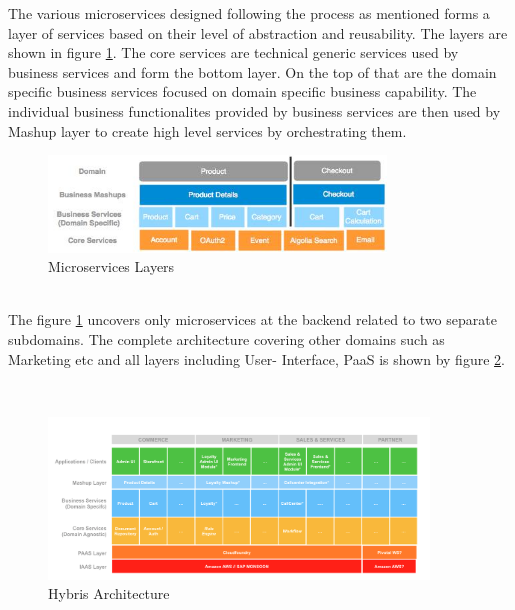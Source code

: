 The various microservices designed following the process as mentioned forms a layer of services based on their level of abstraction and reusability. The layers are shown in figure \ref{fig:hybris_architecture/interview/microservices-layers}. The core services are technical generic services used by business services and form the bottom layer. On the top of that are the domain specific business services focused on domain specific business capability. The individual business functionalites provided by business services are then used by Mashup layer to create high level services by orchestrating them.
\\
\begin{figure}[H]
\begin{center}
\includegraphics[width=0.8\textwidth]{figures/hybris-architecture-four}
\caption{Microservices Layers}
\label{fig:hybris_architecture/interview/microservices-layers}
\end{center}
\end{figure}
\\
The figure \ref{fig:hybris_architecture/interview/microservices-layers} uncovers only microservices at the backend related to two separate subdomains. The complete architecture covering other domains such as Marketing etc and all layers including User- Interface, \acrshort{PaaS} is shown by figure \ref{fig:hybris_architecture/interview/hybris-architecture}.

\\
\begin{figure}[H]
\begin{center}
\includegraphics[width=0.9\textwidth]{figures/hybris-architecture-five}
\caption{Hybris Architecture}
\label{fig:hybris_architecture/interview/hybris-architecture}
\end{center}
\end{figure}
\\














